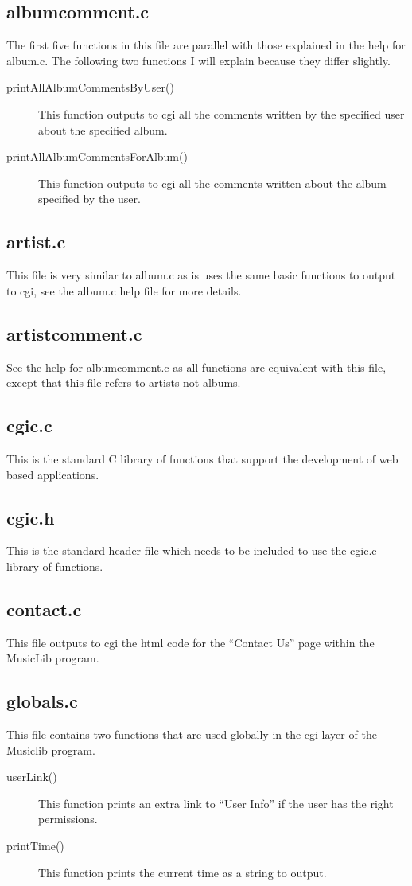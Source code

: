 \documentclass{article}
\begin{document}
\subsection{albumcomment.c}
The first five functions in this file are parallel with those explained in the help for album.c. The following two functions I will explain because they differ slightly.
\begin{description}
\item[printAllAlbumCommentsByUser()]
This function outputs to cgi all the comments written by the specified user about the specified album.
\item[printAllAlbumCommentsForAlbum()]
This function outputs to cgi all the comments written about the album specified by the user.
\end{description}

\subsection{artist.c}
This file is very similar to album.c as is uses the same basic functions to output to cgi, see the album.c help file for more details. 

\subsection{artistcomment.c}
See the help for albumcomment.c as all functions are equivalent with this file, except that this file refers to artists not albums.

\subsection{cgic.c}
This is the standard C library of functions that support the development of web based applications.

\subsection{cgic.h}
This is the standard header file which needs to be included to use the cgic.c library of functions.

\subsection{contact.c}
This file outputs to cgi the html code for the ``Contact Us'' page within the MusicLib program.

\subsection{globals.c}
This file contains two functions that are used globally in the cgi layer of the Musiclib program. 
\begin{description}
\item[userLink()] This function prints an extra link to ``User Info'' if the user has the right permissions.
\item[printTime()] This function prints the current time as a string to output.
\end{description}
\end{document}
